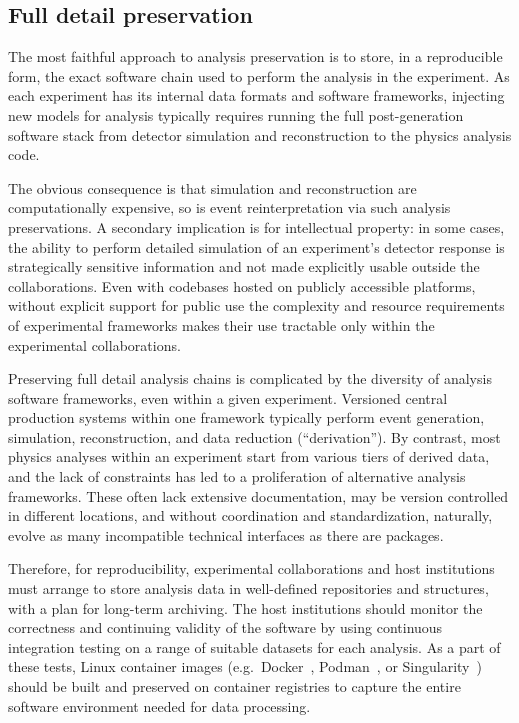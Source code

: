 \documentclass[11pt]{article}
\begin{document}
\subsection{Full detail preservation}\label{section:full-detail-preservation}

The most faithful approach to analysis preservation is to store, in a reproducible form, the exact software chain used to perform the analysis in the experiment. As each experiment has its internal data formats and software frameworks, injecting new models for analysis typically requires running the full post-generation software stack from detector simulation and reconstruction to the physics analysis code.

The obvious consequence is that simulation and reconstruction are computationally expensive, so is event reinterpretation via such \glspl{analysis preservation}. A secondary implication is for intellectual property: in some cases, the ability to perform detailed simulation of an experiment's detector response is strategically sensitive information and not made explicitly usable outside the collaborations. Even with codebases hosted on publicly accessible platforms, without explicit support for public use the complexity and resource requirements of experimental frameworks makes their use tractable only within the experimental collaborations.

Preserving full detail analysis chains is complicated by the diversity of analysis software frameworks, even within a given experiment.
Versioned central production systems within one framework typically perform event generation, simulation, reconstruction, and data reduction (``derivation'').
By contrast, most physics analyses within an experiment start from various tiers of derived data, and the lack of constraints has led to a proliferation of alternative analysis frameworks.
These often lack extensive documentation, may be version controlled in different locations, and without coordination and standardization, naturally, evolve as many incompatible technical interfaces as there are packages.

Therefore, for reproducibility, experimental collaborations and host institutions must arrange to store analysis data in well-defined repositories and structures, with a plan for long-term archiving.
The host institutions should monitor the correctness and continuing validity of the software by using continuous integration testing on a range of suitable datasets for each analysis.
As a part of these tests, Linux container images (e.g.~Docker~\cite{docker}, Podman~\cite{podman}, or Singularity~\cite{singularity}) should be built and preserved on container registries to capture the entire software environment needed for data processing.
\end{document}

